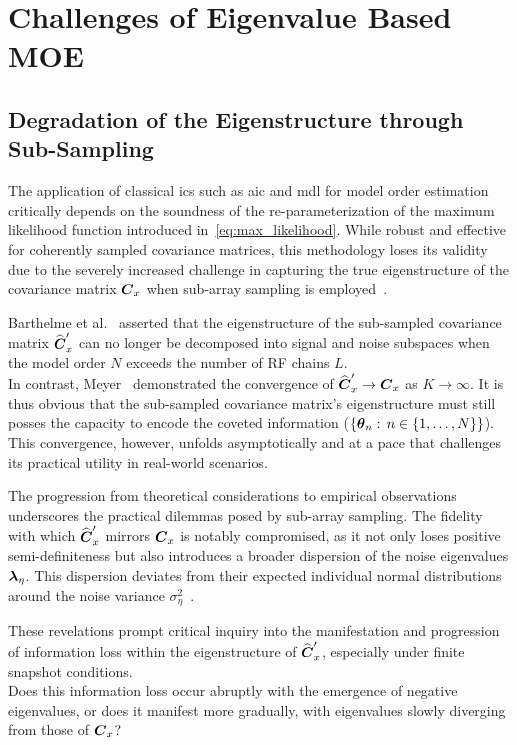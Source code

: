 \section{Challenges of Eigenvalue Based MOE}
\label{sec:challenges_moe}

\subsection{Degradation of the Eigenstructure through Sub-Sampling}

The application of classical \glspl{ic} such as \gls{aic} and \gls{mdl} for model order estimation critically depends on the
soundness of the re-parameterization of the maximum likelihood function introduced in~\autoref{eq:max_likelihood}.
While robust and effective for coherently sampled covariance matrices, this methodology loses its validity
due to the severely increased challenge in capturing the true eigenstructure of the covariance matrix \( \boldsymbol{C}_x \)
when sub-array sampling is employed~\cite{barthelme21sub}.

Barthelme et al.~\cite{barthelme21sub} asserted that the eigenstructure of the sub-sampled covariance matrix \( \widehat{\boldsymbol{C}}'_x \)
can no longer be decomposed into signal and noise subspaces when the model order \( N \) exceeds the number of RF
chains \( L \).\\
In contrast, Meyer~\cite{meyer} demonstrated the convergence of \( \widehat{\boldsymbol{C}}'_x \rightarrow \boldsymbol{C}_x \) as \( K \rightarrow \infty \).
It is thus obvious that the sub-sampled covariance matrix's eigenstructure must still posses the capacity to encode
the coveted information (\( \{ \boldsymbol{\theta}_n :\, n \in \{1, \ldots, N\} \} \)). \\
This convergence, however, unfolds asymptotically and at a pace that challenges its practical utility in real-world scenarios.

The progression from theoretical considerations to empirical observations underscores the practical dilemmas posed by
sub-array sampling. The fidelity with which \( \widehat{\boldsymbol{C}}'_x \) mirrors \( \boldsymbol{C}_x \) is notably compromised, as it not only
loses positive semi-definiteness but also introduces a broader dispersion of the noise eigenvalues \( \boldsymbol{\lambda}_{\eta} \).
This dispersion deviates from their expected individual normal distributions around the noise variance \( \sigma^2_\eta \)~\cite[Chapter 6]{meyer}.

These revelations prompt critical inquiry into the manifestation and progression of information loss within the
eigenstructure of \( \widehat{\boldsymbol{C}}'_x \), especially under finite snapshot conditions. \\
Does this information loss occur abruptly with the emergence of negative eigenvalues, or does it manifest more gradually,
with eigenvalues slowly diverging from those of \( \boldsymbol{C}_x \)?


